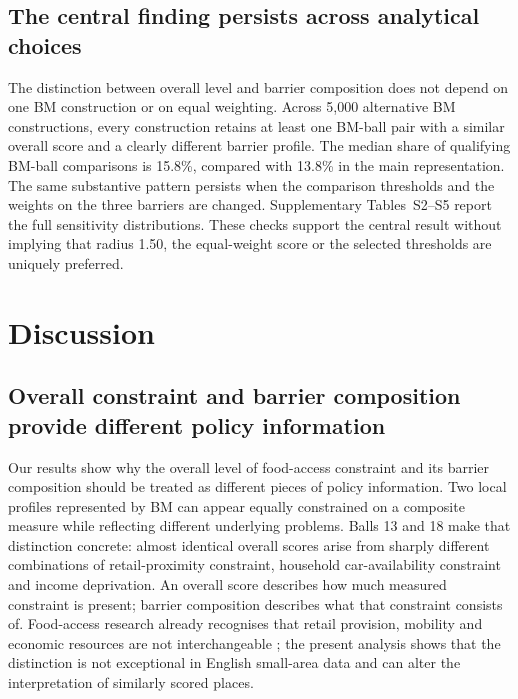 \documentclass[11pt,a4paper]{article}
\begin{document}
\subsection{The central finding persists across analytical choices}
The distinction between overall level and barrier composition does not depend on one BM construction or on equal weighting. Across 5,000 alternative BM constructions, every construction retains at least one BM-ball pair with a similar overall score and a clearly different barrier profile. The median share of qualifying BM-ball comparisons is 15.8\%, compared with 13.8\% in the main representation. The same substantive pattern persists when the comparison thresholds and the weights on the three barriers are changed. Supplementary Tables~S2--S5 report the full sensitivity distributions. These checks support the central result without implying that radius 1.50, the equal-weight score or the selected thresholds are uniquely preferred.

\section{Discussion}
\subsection{Overall constraint and barrier composition provide different policy information}
Our results show why the overall level of food-access constraint and its barrier composition should be treated as different pieces of policy information. Two local profiles represented by BM can appear equally constrained on a composite measure while reflecting different underlying problems. Balls 13 and 18 make that distinction concrete: almost identical overall scores arise from sharply different combinations of retail-proximity constraint, household car-availability constraint and income deprivation. An overall score describes how much measured constraint is present; barrier composition describes what that constraint consists of. Food-access research already recognises that retail provision, mobility and economic resources are not interchangeable \citep{Shaw2006,Titis2022,Beydoun2026}; the present analysis shows that the distinction is not exceptional in English small-area data and can alter the interpretation of similarly scored places.
\end{document}
